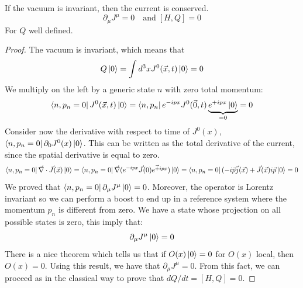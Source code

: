 \documentclass[../main.tex]{subfiles}
\begin{document}
\begin{theorem}[Coleman]
If the vacuum is invariant, then the current is conserved.
\[
\partial_\mu J^\mu=0 \quad \text{and}\;[H,Q]=0
\]
For $Q$ well defined.
\end{theorem}
\begin{proof}
The vacuum is invariant, which means that 
\[
Q\ket{0}=\int d^3xJ^0(\Vec{x},t)\ket{0}=0
\]
We multiply on the left by a generic state $n$ with zero total momentum:
\[
\bra{n,p_n=0}J^0(\Vec{x},t)\ket{0}=\bra{n,p_n}e^{-ipx}J^0(\Vec{0},t)\underbrace{e^{+ipx}\ket{0}}_{=0}=0
\]
Consider now the derivative with respect to time of $J^0(x)$, $\bra{n,p_n=0}\partial_0J^0(x)\ket{0}$. This can be written as the total derivative of the current, since the spatial derivative is equal to zero.
\[
\bra{n,p_n=0}\Vec{\nabla}\cdot\Vec{J}(\Vec{x})\ket{0}=\bra{n,p_n=0}\Vec{\nabla}(e^{-ipx}\Vec{J}(\Vec{0)e^{+ipx}})\ket{0}=\bra{n,p_n=0}(-i\Vec{p}\Vec{j}(\Vec{x})+\Vec{J}(\Vec{x})i\Vec{p}\ket{0}=0
\]
We proved that $\bra{n,p_n=0}\partial_\mu J^\mu\ket{0}=0$. Moreover, the operator is Lorentz invariant so we can perform a boost to end up in a reference system where the momentum $p_n$ is different from zero. We have a state whose projection on all possible states is zero, this imply that:
\[
\partial_\mu J^\mu\ket{0}=0
\]
There is a nice theorem which tells us that if $O(x)\ket{0}=0$ for $O(x)$ local, then $O(x)=0$. Using this result, we have that $\partial_\mu J^\mu=0$. From this fact, we can proceed as in the classical way to prove that $dQ/dt=[H,Q]=0$.
\end{proof}
\end{document}
